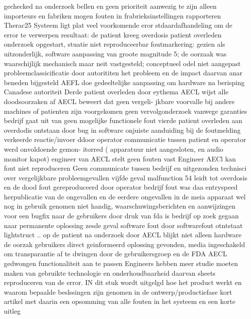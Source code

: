 gechecked na onderzoek bellen en geen prioriteit aanwezig te zijn alleen importeurs en fabriken mogen fouten 
in frabrieksinstellingen rapporteren 
Therac25 Systeem ligt plat veel voorkomende eror stdaardafhandeling om de error te verwerpen resultaat: 
de patient kreeg overdosis patient overleden onderzoek opgestart, stuatie niet reproduceerbar foutmarkering: 
gezien als uitzonderlijk, software aanpassing van groote magnitude 5; de oorzaak was waarschijlijk mechanisch 
maar neit vastgesteld; conceptueel odel niet aangepast probleemclassicificatie door autorititen het probleem 
en de impact daarvan anar beneden bijgesteld AEFL doe gedeeltelijke aanpassing om hardware na berisping 
Canadese autoriteit 
Derde patient overleden door eythema AECL wijst alle doodsoorzaken af AECL beweert dat geen vergeli- 
jkbare voorvalle bij andere machines of patienten zijn voorgekomen geen vervolgonderzoek vanwege garanties 
bedrijf gaat uit van geen mogelijke functionele fout 
vierde patient overleden aan overdodis ontstaan door bug in software onjuiste aanduiding bij de foutmelding 
verkeerde reactie/invoer ddoor operator communicatie tussen patient en operator werd onvoldoende gemon- 
itorred ( apparatuur niet aangesloten, en audio monitor kapot) engineer van AECL stelt geen fouten vast 
Engineer AECl kan fout niet reproduceren Geen communicate tussen bedrijf en uitgezonden technisci over 
vergelijkbare probleemgevallen 
vijfde geval malfunction 54 leidt tot overdosis en de dood fout gereproduceerd door operator bedrijf fout 
was daa entryspeed herpublicatie van de ongevallen en de eerdere ongevallen in de meia apparaat wel nog in 
gebruik genomen niet handig, waarschuwingsberichten en aanwijzingen voor een bugfix naar de gebruikers door 
druk van fda is bedrijf op zoek gegaan naar permanente oplossing 
zesde geval software fout door softwarefout otntstaat lightstruct .. op de patient na onderzoek door AECL 
blijkt niet alleen hardware de oorzak gebruikers direct geinformeerd oplossing gevonden, media ingeschakeld om transparantie af te dwingen door de gebruikersgroep en de FDA AECL gedwongen functionaliteit aan te passen 
Engineers hebben meer studie moeten maken van gebruikte technologie en onderhoudbaarheid daarvan 
sheets
\cite{rogaway2004therac25}
~\cite{wikiTherac25}
reproduceren van de error. IN dit stuk wordt uitgelgd hoe het product werkt en waarom bepaalde beslssingen zijn genomen in de ontwerp/productiefase
\cite{lynch2017theracRaceConditions}
kort artikel met daarin een opsomming van alle fouten in het systeem en een korte uitleg
\cite{lim1998theracdisaster}
